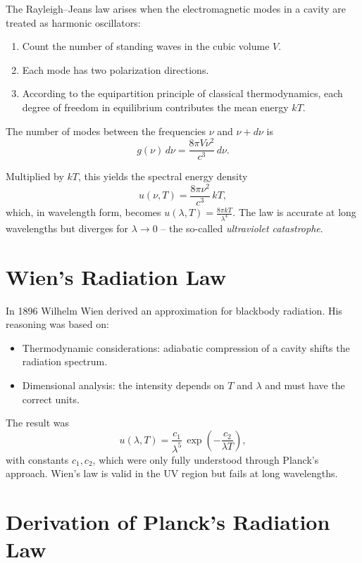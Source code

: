 The Rayleigh–Jeans law arises when the electromagnetic modes in a cavity are
treated as harmonic oscillators:

\begin{enumerate}
	\item Count the number of standing waves in the cubic volume $V$.
	\item Each mode has two polarization directions.
	\item According to the equipartition principle of classical thermodynamics,
	each degree of freedom in equilibrium contributes the mean energy $kT$.
\end{enumerate}

The number of modes between the frequencies $\nu$ and $\nu + d\nu$ is
\[
g(\nu)\, d\nu = \frac{8\pi V \nu^2}{c^3}\, d\nu.
\]

Multiplied by $kT$, this yields the spectral energy density
\[
u(\nu, T) = \frac{8\pi \nu^2}{c^3}\, kT,
\]
which, in wavelength form, becomes $u(\lambda, T) = \tfrac{8\pi kT}{\lambda^4}$.
The law is accurate at long wavelengths but diverges for $\lambda \to 0$ – the
so-called \emph{ultraviolet catastrophe}.

\section{Wien’s Radiation Law}
\label{anhangA:wien}

In 1896 Wilhelm Wien derived an approximation for blackbody radiation.
His reasoning was based on:

\begin{itemize}
	\item Thermodynamic considerations: adiabatic compression of a cavity shifts
	the radiation spectrum.
	\item Dimensional analysis: the intensity depends on $T$ and $\lambda$ and
	must have the correct units.
\end{itemize}

The result was
\[
u(\lambda, T) = \frac{c_1}{\lambda^5}\,
\exp\!\left(-\frac{c_2}{\lambda T}\right),
\]
with constants $c_1, c_2$, which were only fully understood through Planck’s
approach. Wien’s law is valid in the UV region but fails at long wavelengths.

\section{Derivation of Planck’s Radiation Law}
\label{anhangA:planck}

